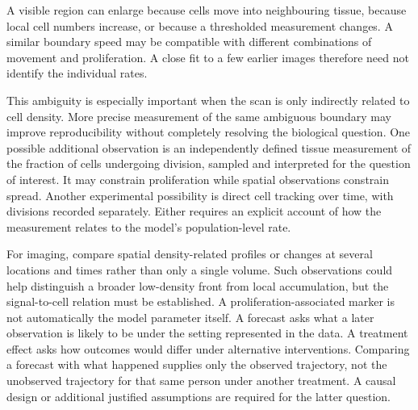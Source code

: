 \biomedicalanswer
{}
A visible region can enlarge because cells move into neighbouring tissue, because local cell numbers increase, or because a thresholded measurement changes. A similar boundary speed may be compatible with different combinations of movement and proliferation. A close fit to a few earlier images therefore need not identify the individual rates.

This ambiguity is especially important when the scan is only indirectly related to cell density. More precise measurement of the same ambiguous boundary may improve reproducibility without completely resolving the biological question.
One possible additional observation is an independently defined tissue measurement of the fraction of cells undergoing division, sampled and interpreted for the question of interest. It may constrain proliferation while spatial observations constrain spread. Another experimental possibility is direct cell tracking over time, with divisions recorded separately. Either requires an explicit account of how the measurement relates to the model's population-level rate.

For imaging, compare spatial density-related profiles or changes at several locations and times rather than only a single volume. Such observations could help distinguish a broader low-density front from local accumulation, but the signal-to-cell relation must be established. A proliferation-associated marker is not automatically the model parameter itself.
A forecast asks what a later observation is likely to be under the setting represented in the data. A treatment effect asks how outcomes would differ under alternative interventions. Comparing a forecast with what happened supplies only the observed trajectory, not the unobserved trajectory for that same person under another treatment. A causal design or additional justified assumptions are required for the latter question.

